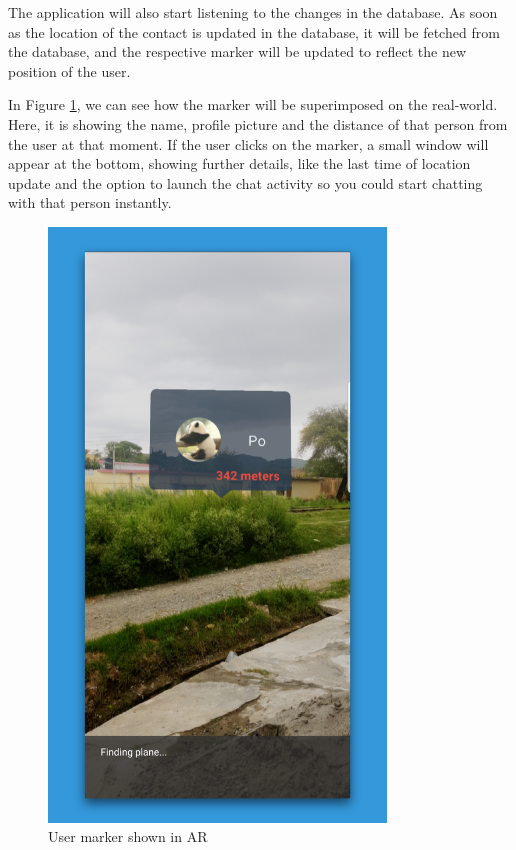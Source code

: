 The application will also start listening to the changes in the database. As soon as the location of the contact is updated in the database, it will be fetched from the database, and the respective marker will be updated to reflect the new position of the user.

In Figure \ref{fig:khoji_ar_marker}, we can see how the marker will be superimposed on the real-world. Here, it is showing the name, profile picture and the distance of that person from the user at that moment. If the user clicks on the marker, a small window will appear at the bottom, showing further details, like the last time of location update and the option to launch the chat activity so you could start chatting with that person instantly.

\begin{figure}[H]
	\centering
		\includegraphics[width=0.80\textwidth]{images/khoji_ar_marker.png}
	\caption{User marker shown in AR}
	\label{fig:khoji_ar_marker}
\end{figure}


